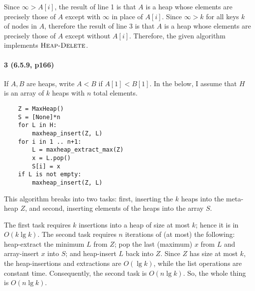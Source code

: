 \documentclass[
]{article}
\begin{document}
Since $\infty>A[i]$, the result of line 1 is that $A$ is a heap whose elements are precisely those of $A$ except with $\infty$ in place of $A[i]$.  Since $\infty>k$ for all keys $k$ of nodes in $A$, therefore the result of line 3 is that $A$ is a heap whose elements are precisely those of $A$ except without $A[i]$.  Therefore, the given algorithm implements $\textsc{Heap-Delete}$.

\paragraph{3 (6.5.9, p166)} If $A,B$ are heaps, write $A<B$ if $A[1]<B[1]$.
In the below, I assume that $H$ is an array of $k$ heaps with $n$ total elements.
\begin{verbatim}
    Z = MaxHeap()
    S = [None]*n
    for L in H:
        maxheap_insert(Z, L)
    for i in 1 .. n+1:
        L = maxheap_extract_max(Z)
        x = L.pop()
        S[i] = x
    if L is not empty:
        maxheap_insert(Z, L)
\end{verbatim}
This algorithm breaks into two tasks: first, inserting the $k$ heaps into the meta-heap $Z$, and second, inserting elements of the heaps into the array $S$.  

The first task requires $k$ insertions into a heap of size at most $k$; hence it is in $O(k\lg k)$.  The second task requires $n$ iterations of (at most) the following: heap-extract the minimum $L$ from $Z$; pop the last (maximum) $x$ from $L$ and array-insert $x$ into $S$; and heap-insert $L$ back into $Z$.  Since $Z$ has size at most $k$, the heap-insertions and extractions are $O(\lg k)$, while the list operations are constant time.  Consequently, the second task is $O(n\lg k)$.  So, the whole thing is $O(n\lg k)$.
\end{document}
